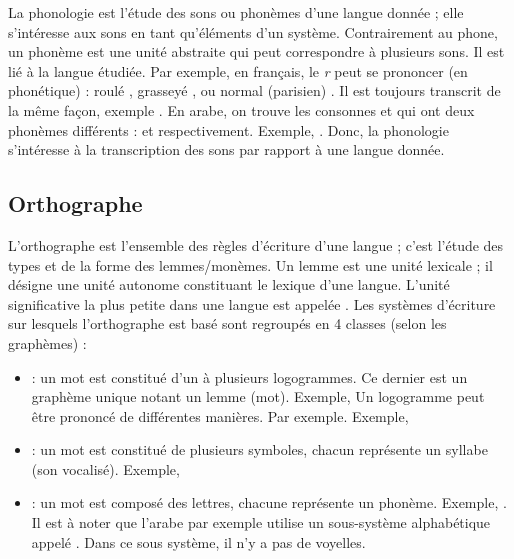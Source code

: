 \documentclass{KodeBook}
\begin{document}
La phonologie est l'étude des sons ou phonèmes d'une langue donnée ; elle s'intéresse aux sons en tant qu'éléments d'un système. 
Contrairement au phone, un phonème est une unité abstraite qui peut correspondre à plusieurs sons.
Il est lié à la langue étudiée. 
Par exemple, en français, le \textit{r} peut se prononcer (en phonétique) : roulé \expword{\textipa{[r]}}, grasseyé \expword{\textipa{[\;R]}}, ou normal (parisien) \expword{\textipa{[K]}}. 
Il est toujours transcrit de la même façon, exemple . 
En arabe, on trouve les consonnes  et  qui ont deux phonèmes différents :  et  respectivement. 
Exemple, . 
Donc, la phonologie s'intéresse à la transcription des sons par rapport à une langue donnée.

\subsection{Orthographe}

L'orthographe est l'ensemble des règles d'écriture d'une langue ; c'est l'étude des types et de la forme des lemmes/monèmes. 
Un lemme est une unité lexicale ; il désigne une unité autonome constituant le lexique d'une langue.
L'unité significative la plus petite dans une langue est appelée .
Les systèmes d'écriture sur lesquels l'orthographe est basé sont regroupés en 4 classes (selon les graphèmes) : 
\begin{itemize}
	\item {} : un mot est constitué d'un à plusieurs logogrammes.
	Ce dernier est un graphème unique notant un lemme (mot).
	Exemple, 
	Un logogramme peut être prononcé de différentes manières. 
	Par exemple. Exemple, 
	
	\item {} : un mot est constitué de plusieurs symboles, chacun représente un syllabe (son vocalisé). 
	Exemple, 
	\item {} : un mot est composé des lettres, chacune représente un phonème. 
	Exemple, . 
	Il est à noter que l'arabe par exemple utilise un sous-système alphabétique appelé . 
	Dans ce sous système, il n'y a pas de voyelles.
\end{itemize}
\end{document}
